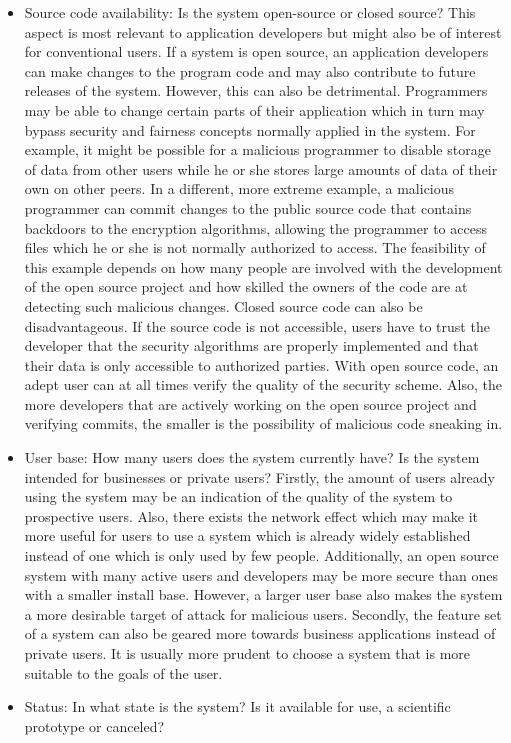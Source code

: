 \begin{itemize}
\item Source code availability: Is the system open-source or closed source?
This aspect is most relevant to application developers but might also be of interest for conventional users. If a system is open source, an application developers can make changes to the program code and may also contribute to future releases of the system. However, this can also be detrimental. Programmers may be able to change certain parts of their application which in turn may bypass security and fairness concepts normally applied in the system. For example, it might be possible for a malicious programmer to disable storage of data from other users while he or she stores large amounts of data of their own on other peers. In a different, more extreme example, a malicious programmer can commit changes to the public source code that contains backdoors to the encryption algorithms, allowing the programmer to access files which he or she is not normally authorized to access. The feasibility of this example depends on how many people are involved with the development of the open source project and how skilled the owners of the code are at detecting such malicious changes.
Closed source code can also be disadvantageous. If the source code is not accessible, users have to trust the developer that the security algorithms are properly implemented and that their data is only accessible to authorized parties. With open source code, an adept user can at all times verify the quality of the security scheme. Also, the more developers that are actively working on the open source project and verifying commits, the smaller is the possibility of malicious code sneaking in.

\item User base: How many users does the system currently have? Is the system intended for businesses or private users?
Firstly, the amount of users already using the system may be an indication of the quality of the system to prospective users. Also, there exists the network effect which may make it more useful for users to use a system which is already widely established instead of one which is only used by few people. Additionally, an open source system with many active users and developers may be more secure than ones with a smaller install base. However, a larger user base also makes the system a more desirable target of attack for malicious users. Secondly, the feature set of a system can also be geared more towards business applications instead of private users. It is usually more prudent to choose a system that is more suitable to the goals of the user.

\item Status: In what state is the system? Is it available for use, a scientific prototype or canceled?
\end{itemize}

